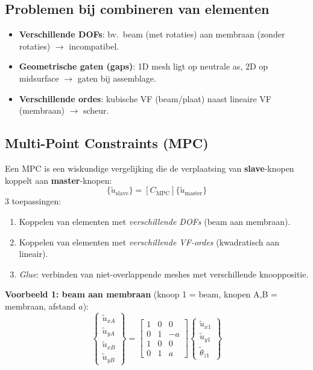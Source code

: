 \documentclass[a4paper,10pt]{article}
\begin{document}
\subsection*{Problemen bij combineren van elementen}

\begin{itemize}
  \item \textbf{Verschillende DOFs}: bv.\ beam (met rotaties) aan membraan (zonder rotaties) $\to$ incompatibel.
  \item \textbf{Geometrische gaten (gaps)}: 1D mesh ligt op neutrale as, 2D op midsurface $\to$ gaten bij assemblage.
  \item \textbf{Verschillende ordes}: kubische VF (beam/plaat) naast lineaire VF (membraan) $\to$ scheur.
\end{itemize}

\subsection*{Multi-Point Constraints (MPC)}

\begin{exambox}
Een MPC is een wiskundige vergelijking die de verplaatsing van \textbf{slave}-knopen koppelt aan \textbf{master}-knopen:
\[
  \{\tilde{u}_{\text{slave}}\} = [C_{\text{MPC}}]\{\tilde{u}_{\text{master}}\}
\]
3 toepassingen:
\begin{enumerate}
  \item Koppelen van elementen met \emph{verschillende DOFs} (beam aan membraan).
  \item Koppelen van elementen met \emph{verschillende VF-ordes} (kwadratisch aan lineair).
  \item \emph{Glue}: verbinden van niet-overlappende meshes met verschillende knooppositie.
\end{enumerate}
\end{exambox}

\textbf{Voorbeeld 1: beam aan membraan} (knoop 1 = beam, knopen A,B = membraan, afstand $a$):
\[
  \begin{Bmatrix}\tilde{u}_{xA}\\\tilde{u}_{yA}\\\tilde{u}_{xB}\\\tilde{u}_{yB}\end{Bmatrix} =
  \begin{bmatrix}1&0&0\\0&1&-a\\1&0&0\\0&1&a\end{bmatrix}
  \begin{Bmatrix}\tilde{u}_{x1}\\\tilde{u}_{y1}\\\tilde{\theta}_{z1}\end{Bmatrix}
\]
\end{document}
